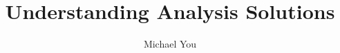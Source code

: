 \documentclass{article}
\title{Understanding Analysis Solutions}
\author{Michael You}
\date{}
\begin{document}
\begin{titlingpage}
\maketitle
\end{titlingpage}




\end{document}
